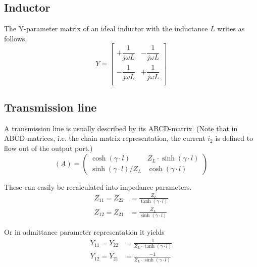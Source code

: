 \subsection{Inductor}

The Y-parameter matrix of an ideal inductor with the inductance $L$
writes as follows.
\begin{equation}
Y =
\begin{bmatrix}
+\dfrac{1}{j\omega L} & -\dfrac{1}{j\omega L}\\
-\dfrac{1}{j\omega L} & +\dfrac{1}{j\omega L}\\
\end{bmatrix}
\end{equation}

\subsection{Transmission line}

A transmission line is usually described by its ABCD-matrix.  (Note
that in ABCD-matrices, i.e. the chain matrix representation, the
current $i_2$ is defined to flow out of the output port.)
\begin{equation}
\left(\underline{A}\right) =
\begin{pmatrix}
\cosh{\left(\gamma\cdot l\right)} & Z_L\cdot \sinh{\left(\gamma\cdot l\right)}\\
\sinh{\left(\gamma\cdot l\right)} / Z_L & \cosh{\left(\gamma\cdot l\right)}
\end{pmatrix}
\end{equation}

These can easily be recalculated into impedance parameters.
\begin{align}
Z_{11} = Z_{22} &= \frac{Z_L}{\tanh{\left(\gamma\cdot l\right)}}\\
Z_{12} = Z_{21} &= \frac{Z_L}{\sinh{\left(\gamma\cdot l\right)}}
\end{align}

Or in admittance parameter representation it yields
\begin{equation}
\label{eq:TransLineY}
\begin{split}
Y_{11} = Y_{22} &= \frac{1}{Z_L \cdot \tanh{\left(\gamma\cdot l\right)}}\\
Y_{12} = Y_{21} &= \frac{-1}{Z_L\cdot \sinh{\left(\gamma\cdot l\right)}}
\end{split}
\end{equation}

